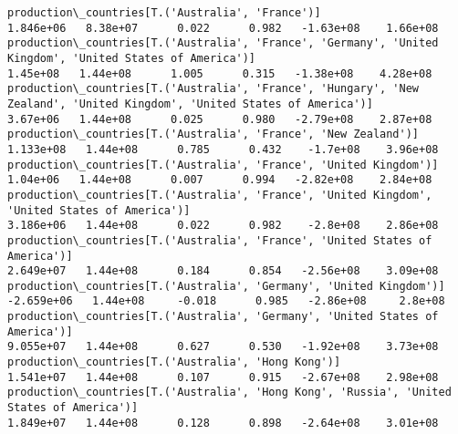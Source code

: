 \documentclass[11pt]{article}
\begin{document}
\begin{Verbatim}[commandchars=\\\{\}]
production\_countries[T.('Australia', 'France')]                                                                                                                                        1.846e+06   8.38e+07      0.022      0.982   -1.63e+08    1.66e+08
production\_countries[T.('Australia', 'France', 'Germany', 'United Kingdom', 'United States of America')]                                                                                1.45e+08   1.44e+08      1.005      0.315   -1.38e+08    4.28e+08
production\_countries[T.('Australia', 'France', 'Hungary', 'New Zealand', 'United Kingdom', 'United States of America')]                                                                 3.67e+06   1.44e+08      0.025      0.980   -2.79e+08    2.87e+08
production\_countries[T.('Australia', 'France', 'New Zealand')]                                                                                                                         1.133e+08   1.44e+08      0.785      0.432    -1.7e+08    3.96e+08
production\_countries[T.('Australia', 'France', 'United Kingdom')]                                                                                                                       1.04e+06   1.44e+08      0.007      0.994   -2.82e+08    2.84e+08
production\_countries[T.('Australia', 'France', 'United Kingdom', 'United States of America')]                                                                                          3.186e+06   1.44e+08      0.022      0.982    -2.8e+08    2.86e+08
production\_countries[T.('Australia', 'France', 'United States of America')]                                                                                                            2.649e+07   1.44e+08      0.184      0.854   -2.56e+08    3.09e+08
production\_countries[T.('Australia', 'Germany', 'United Kingdom')]                                                                                                                    -2.659e+06   1.44e+08     -0.018      0.985   -2.86e+08     2.8e+08
production\_countries[T.('Australia', 'Germany', 'United States of America')]                                                                                                           9.055e+07   1.44e+08      0.627      0.530   -1.92e+08    3.73e+08
production\_countries[T.('Australia', 'Hong Kong')]                                                                                                                                     1.541e+07   1.44e+08      0.107      0.915   -2.67e+08    2.98e+08
production\_countries[T.('Australia', 'Hong Kong', 'Russia', 'United States of America')]                                                                                               1.849e+07   1.44e+08      0.128      0.898   -2.64e+08    3.01e+08

\end{Verbatim}
\end{document}
